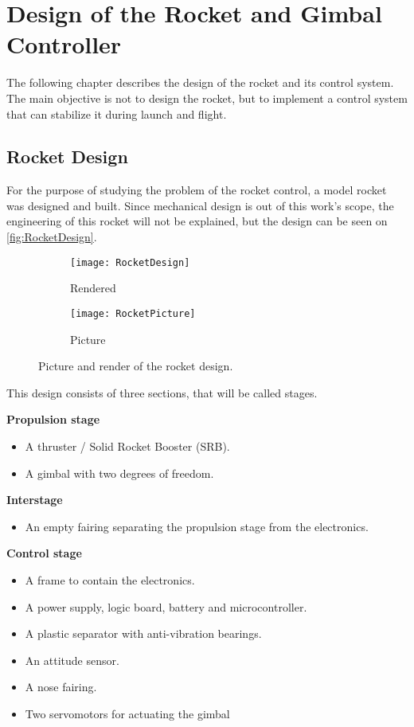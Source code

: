 
\chapter{Design of the Rocket and Gimbal Controller}
\graphicspath{{figures/Rocket/design/}}
The following chapter describes the design of the rocket and its control system. The main objective is not to design the rocket, but to implement a control system that can stabilize it during launch and flight. 

\section{Rocket Design}
For the purpose of studying the problem of the rocket control, a model rocket was designed and built. Since mechanical design is out of this work's scope, the engineering of this rocket will not be explained, but the design can be seen on \autoref{fig:RocketDesign}.
\begin{figure}[htbp]
\centering
\begin{subfigure}{0.4\textwidth}
\texttt{[image: RocketDesign]}
\caption{Rendered}
\label{fig:RocketRender}
\end{subfigure}
\begin{subfigure}{0.415\textwidth}
\texttt{[image: RocketPicture]}
\caption{Picture}
\label{fig:RocketPicture}
\end{subfigure}
\caption{Picture and render of the rocket design.}
\label{fig:RocketDesign}
\end{figure}
This design consists of three sections, that will be called stages.

\textbf{Propulsion stage}
\begin{itemize}[noitemsep]
	\item {A thruster / Solid Rocket Booster (SRB).}
	\item {A gimbal with two degrees of freedom.}
\end{itemize}

\textbf{Interstage}
\begin{itemize}[noitemsep]
	\item {An empty fairing separating the propulsion stage from the electronics.}
\end{itemize}
\textbf{Control stage}
\begin{itemize}[noitemsep]
	\item A frame to contain the electronics.
	\item A power supply, logic board, battery and microcontroller.
	\item A plastic separator with anti-vibration bearings.
	\item An attitude sensor.
	\item A nose fairing.
	\item {Two servomotors for actuating the gimbal}
\end{itemize}

